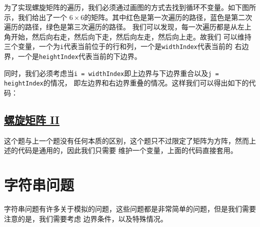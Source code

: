 \documentclass[../../main.tex]{subfiles}
\begin{document}
为了实现螺旋矩阵的遍历，我们必须通过画图的方式去找到循环不变量。如下图所示，我们给出了一个
$6 \times 6$的矩阵。其中红色是第一次遍历的路径，蓝色是第二次遍历的路径，绿色是第三次遍历的路径。
我们可以发现，每一次遍历都是从左上角开始，然后向右走，然后向下走，然后向左走，然后向上走。故我们
可以维持三个变量，一个为\texttt{i}代表当前位于的行和列，一个是\texttt{widthIndex}代表当前的
右边界，一个是\texttt{heightIndex}代表当前的下边界。


同时，我们必须考虑当\texttt{i = widthIndex}即上边界与下边界重合以及\texttt{j = heightIndex}的情况，
即左边界和右边界重叠的情况。这样我们可以得出如下的代码：



\subsection{\href{https://leetcode.cn/problems/spiral-matrix-ii/}{螺旋矩阵 II}}

这个题与上一个题没有任何本质的区别，这个题只不过限定了矩阵为方阵，然而上述的代码是通用的，因此我们只需要
维护一个变量，上面的代码直接套用。



\section{字符串问题}

字符串问题有许多关于模拟的问题，这些问题都是非常简单的问题，但是我们需要注意的是，我们需要考虑
边界条件，以及特殊情况。
\end{document}
